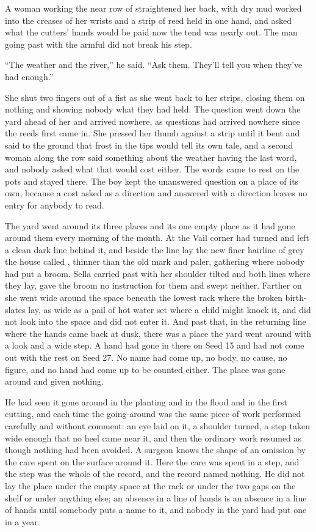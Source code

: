 A woman working the near row of  straightened her back, with dry mud worked into the creases of her wrists and a strip of reed held in one hand, and asked what the cutters' hands would be paid now the tend was nearly out. The man going past with the armful did not break his step.

“The weather and the river,” he said. “Ask them. They'll tell you when they've had enough.”

She shut two fingers out of a fist as she went back to her strips, closing them on nothing and showing nobody what they had held. The question went down the yard ahead of her and arrived nowhere, as questions had arrived nowhere since the reeds first came in. She pressed her thumb against a strip until it bent and said to the ground that frost in the tips would tell its own tale, and a second woman along the row said something about the weather having the last word, and nobody asked what that would cost either. The words came to rest on the pots and stayed there. The boy kept the unanswered question on a place of its own, because a cost asked as a direction and answered with a direction leaves no entry for anybody to read.

The yard went around its three places and its one empty place as it had gone around them every morning of the month. At the Vail corner  had turned and left a clean dark line behind it, and beside the line lay the new finer hairline of grey the house called , thinner than the old mark and paler, gathering where nobody had put a broom. Sella carried past with her shoulder tilted and both lines where they lay, gave the broom no instruction for them and swept neither. Farther on she went wide around the space beneath the lowest rack where the broken birth-slates lay, as wide as a pail of hot water set where a child might knock it, and did not look into the space and did not enter it. And past that, in the returning line where the hands came back at dusk, there was a place the yard went around with a look and a wide step. A hand had gone in there on Seed 15 and had not come out with the rest on Seed 27. No name had come up, no body, no cause, no figure, and no hand had come up to be counted either. The place was gone around and given nothing.

He had seen it gone around in the planting and in the flood and in the first cutting, and each time the going-around was the same piece of work performed carefully and without comment: an eye laid on it, a shoulder turned, a step taken wide enough that no heel came near it, and then the ordinary work resumed as though nothing had been avoided. A surgeon knows the shape of an omission by the care spent on the surface around it. Here the care was spent in a step, and the step was the whole of the record, and the record named nothing. He did not lay the place under the empty space at the rack or under the two gaps on the shelf or under anything else; an absence in a line of hands is an absence in a line of hands until somebody puts a name to it, and nobody in the yard had put one in a year.

